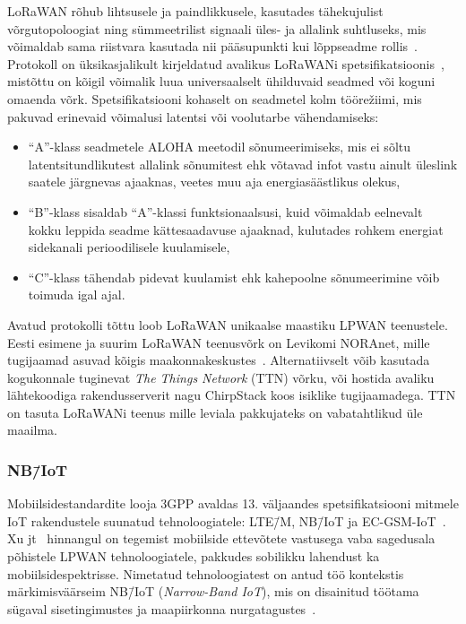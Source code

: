 \documentclass[12pt]{article}
\begin{document}
    LoRaWAN rõhub lihtsusele ja paindlikkusele, kasutades tähekujulist võrgutopoloogiat ning sümmeetrilist signaali üles- ja allalink suhtluseks, mis võimaldab sama riistvara kasutada nii pääsupunkti kui lõppseadme rollis~\cite{lorawanIntro}.
    Protokoll on üksikasjalikult kirjeldatud avalikus LoRaWANi spetsifikatsioonis~\cite{lorawanspec}, mistõttu on kõigil võimalik luua universaalselt ühilduvaid seadmed või koguni omaenda võrk.
    Spetsifikatsiooni kohaselt on seadmetel kolm töörežiimi, mis pakuvad erinevaid võimalusi latentsi või voolutarbe vähendamiseks:
    \begin{itemize}
        \item "`A"'-klass seadmetele ALOHA meetodil sõnumeerimiseks, mis ei sõltu latentsitundlikutest allalink sõnumitest ehk võtavad infot vastu ainult üleslink saatele järgnevas ajaaknas, veetes muu aja energiasäästlikus olekus,
        \item "`B"'-klass sisaldab "`A"'-klassi funktsionaalsusi, kuid võimaldab eelnevalt kokku leppida seadme kättesaadavuse ajaaknad, kulutades rohkem energiat sidekanali perioodilisele kuulamisele,
        \item "`C"'-klass tähendab pidevat kuulamist ehk kahepoolne sõnumeerimine võib toimuda igal ajal.
    \end{itemize}

    Avatud protokolli tõttu loob LoRaWAN unikaalse maastiku LPWAN teenustele.
    Eesti esimene ja suurim LoRaWAN teenusvõrk on Levikomi NORAnet, mille tugijaamad asuvad kõigis maakonnakeskustes~\cite{noranetuudis}.
    Alternatiivselt võib kasutada kogukonnale tuginevat \textit{The Things Network} (TTN) võrku, või hostida avaliku lähtekoodiga rakendusserverit nagu ChirpStack koos isiklike tugijaamadega.
    TTN on tasuta LoRaWANi teenus mille leviala pakkujateks on vabatahtlikud üle maailma.

    \subsubsection{NB\=/IoT}

    Mobiilsidestandardite looja 3GPP avaldas 13. väljaandes spetsifikatsiooni mitmele IoT rakendustele suunatud tehnoloogiatele: LTE\=/M, NB\=/IoT ja EC-GSM-IoT~\cite{3gppiot}.
    Xu jt~\cite{xuyao} hinnangul on tegemist mobiilside ettevõtete vastusega vaba sagedusala põhistele LPWAN tehnoloogiatele, pakkudes sobilikku lahendust ka mobiilsidespektrisse.
    Nimetatud tehnoloogiatest on antud töö kontekstis märkimisväärseim NB\=/IoT (\textit{Narrow-Band IoT}), mis on disainitud töötama sügaval sisetingimustes ja maapiirkonna nurgatagustes~\cite{martinez}.
\end{document}
